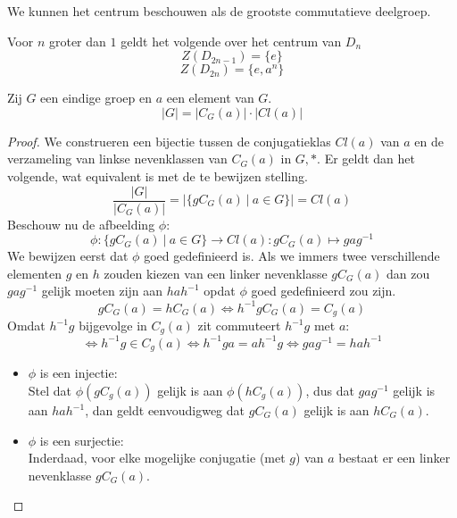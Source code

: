 \documentclass[main.tex]{subfiles}
\begin{document}
\begin{opm}
  We kunnen het centrum beschouwen als de grootste commutatieve deelgroep.
\end{opm}

\begin{st}
  Voor $n$ groter dan $1$ geldt het volgende over het centrum van $D_{n}$
  \[ Z(D_{2n-1}) = \{e\} \]
  \[ Z(D_{2n}) = \{e,a^{n}\} \]
  
\end{st}

\begin{st}
  \label{st:orde-conjugatieklasse-centralisator}
  Zij $G$ een eindige groep en $a$ een element van $G$.
  \[ |G| = |C_{G}(a)|\cdot|Cl(a)| \]

  \begin{proof}
    We construeren een bijectie tussen de conjugatieklas $Cl(a)$ van $a$ en de verzameling van linkse nevenklassen van $C_{G}(a)$ in $G,*$.
    Er geldt dan het volgende, wat equivalent is met de te bewijzen stelling.
    \[ \frac{|G|}{|C_{G}(a)|} = |\{ gC_{G}(a) \ |\ a \in G \}| = Cl(a) \]
    Beschouw nu de afbeelding $\phi$:
    \[ \phi: \{ gC_{G}(a) \ |\ a \in G \} \rightarrow Cl(a): gC_{G}(a) \mapsto gag^{-1} \]
    We bewijzen eerst dat $\phi$ goed gedefinieerd is.
    Als we immers twee verschillende elementen $g$ en $h$ zouden kiezen van een linker nevenklasse $gC_{G}(a)$ dan zou $gag^{-1}$ gelijk moeten zijn aan $hah^{-1}$ opdat $\phi$ goed gedefinieerd zou zijn.
    \[ gC_{G}(a) = hC_{G}(a) \Leftrightarrow h^{-1}gC_{G}(a) = C_{g}(a) \]
    Omdat $h^{-1}g$ bijgevolge in $C_{g}(a)$ zit commuteert $h^{-1}g$ met $a$:
    \[ \Leftrightarrow h^{-1}g \in C_{g}(a) \Leftrightarrow h^{-1}ga = ah^{-1}g \Leftrightarrow gag^{-1} = hah^{-1} \]
    \begin{itemize}
    \item $\phi$ is een injectie:\\
      Stel dat $\phi(gC_{g}(a))$ gelijk is aan $\phi(hC_{g}(a))$, dus dat $gag^{-1}$ gelijk is aan $hah^{-1}$, dan geldt eenvoudigweg dat $gC_{G}(a)$ gelijk is aan $hC_{G}(a)$.
    \item $\phi$ is een surjectie:\\
      Inderdaad, voor elke mogelijke conjugatie (met $g$) van $a$ bestaat er een linker nevenklasse $gC_{G}(a)$.
    \end{itemize}
  \end{proof}
\end{st}
\end{document}
